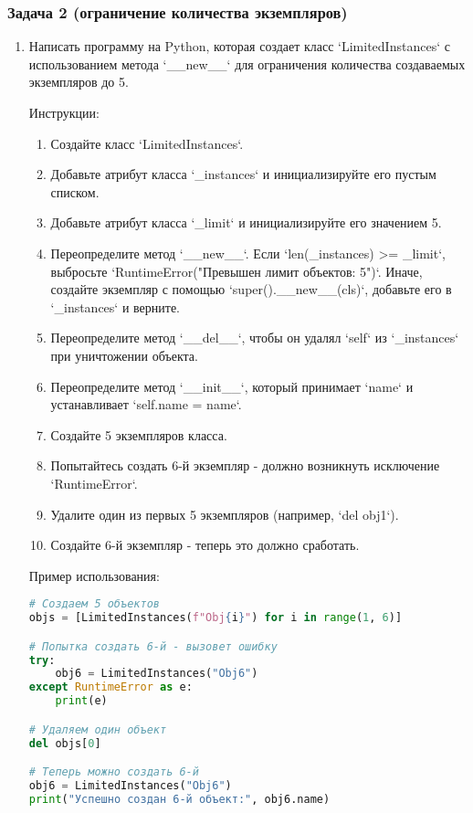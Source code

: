 \subsubsection{Задача 2 (ограничение количества экземпляров)}
\begin{enumerate}
\item Написать программу на Python, которая создает класс `LimitedInstances` с использованием метода `\_\_new\_\_` для ограничения количества создаваемых экземпляров до 5.

Инструкции:
\begin{enumerate}
    \item Создайте класс `LimitedInstances`.
    \item Добавьте атрибут класса `\_instances` и инициализируйте его пустым списком.
    \item Добавьте атрибут класса `\_limit` и инициализируйте его значением 5.
    \item Переопределите метод `\_\_new\_\_`. Если `len(\_instances) >= \_limit`, выбросьте `RuntimeError("Превышен лимит объектов: 5")`. Иначе, создайте экземпляр с помощью `super().\_\_new\_\_(cls)`, добавьте его в `\_instances` и верните.
    \item Переопределите метод `\_\_del\_\_`, чтобы он удалял `self` из `\_instances` при уничтожении объекта.
    \item Переопределите метод `\_\_init\_\_`, который принимает `name` и устанавливает `self.name = name`.
    \item Создайте 5 экземпляров класса.
    \item Попытайтесь создать 6-й экземпляр - должно возникнуть исключение `RuntimeError`.
    \item Удалите один из первых 5 экземпляров (например, `del obj1`).
    \item Создайте 6-й экземпляр - теперь это должно сработать.
\end{enumerate}

Пример использования:
\begin{lstlisting}[language=Python]
# Создаем 5 объектов
objs = [LimitedInstances(f"Obj{i}") for i in range(1, 6)]

# Попытка создать 6-й - вызовет ошибку
try:
    obj6 = LimitedInstances("Obj6")
except RuntimeError as e:
    print(e)

# Удаляем один объект
del objs[0]

# Теперь можно создать 6-й
obj6 = LimitedInstances("Obj6")
print("Успешно создан 6-й объект:", obj6.name)
\end{lstlisting}


\end{enumerate}
